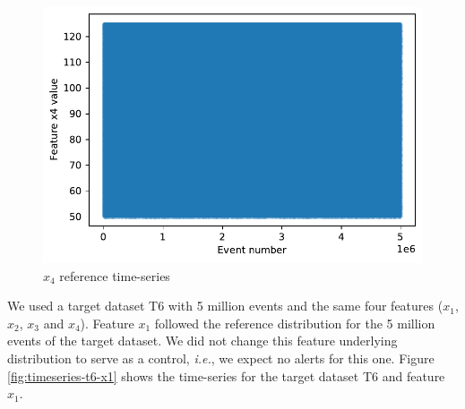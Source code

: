 \documentclass[sigconf]{acmart}
\begin{document}
\begin{figure}[!htb]
    \begin{center}
      \includegraphics[scale=0.5]{figures/timeseries-r6-x4.pdf} 
      \caption{$x_4$ reference time-series} 
      \label{fig:timeseries-r6-x4} 
    \end{center}
\end{figure}
We used a target dataset T6 with 5 million events and the same four features ($x_1$, $x_2$, $x_3$ and $x_4$). Feature $x_1$ followed the reference distribution for the 5 million events of the target dataset. We did not change this feature underlying distribution to serve as a control, \textit{i.e.}, we expect no alerts for this one. Figure \ref{fig:timeseries-t6-x1} shows the time-series for the target dataset T6 and feature $x_1$.
\end{document}
